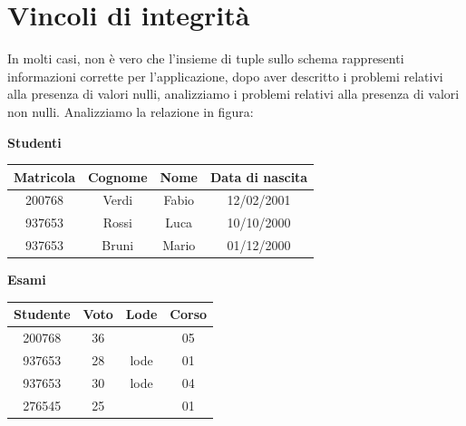 \documentclass[12pt]{report}
\begin{document}
	\section{Vincoli di integrità}
	In molti casi, non è vero che l'insieme di tuple sullo schema rappresenti informazioni corrette per l'applicazione, dopo aver descritto i problemi relativi alla presenza di valori nulli, analizziamo i problemi relativi alla presenza di valori non nulli. Analizziamo la relazione in figura:
	\begin{center}
		\textbf{Studenti}

		\vspace{0.3cm}

		\begin{tabular}{|c|c|c|c|}
			\hline
			\textbf{Matricola} & \textbf{Cognome} & \textbf{Nome} & \textbf{Data di nascita} \\
			\hline
			200768 & Verdi & Fabio & 12/02/2001 \\
			937653 & Rossi & Luca & 10/10/2000 \\
			937653 & Bruni & Mario & 01/12/2000 \\
			\hline
		\end{tabular}
	\end{center}

	\vspace{1cm}

	\begin{center}
		\textbf{Esami}

		\vspace{0.3cm}

		\begin{tabular}{|c|c|c|c|}
			\hline
			\textbf{Studente} & \textbf{Voto} & \textbf{Lode} & \textbf{Corso} \\
			\hline
			200768 & 36 & & 05 \\
			937653 & 28 & lode & 01 \\
			937653 & 30 & lode & 04 \\
			276545 & 25 & & 01 \\
			\hline
		\end{tabular}
	\end{center}

	\vspace{1cm}
\end{document}
